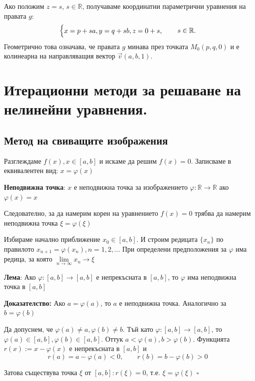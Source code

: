 \documentclass{article}
\renewcommand{\\}{\newline}
\newcommand{\doc}{\textbf{Доказателство: }}
\newcommand{\proven}{\hfill $\square$}
\begin{document}
Ако положим $z = s$, $s \in \mathbb{R}$, получаваме координатни параметрични уравнения на правата $g$:
\[
\begin{cases}
x = p + s a, \\
y = q + s b, \\
z = 0 + s,
\end{cases}
\quad s \in \mathbb{R}.
\]
Геометрично това означава, че правата $g$ минава през точката $M_0(p, q, 0)$ и е колинеарна на направляващия вектор $\vec{v}(a, b, 1)$.
\newpage


\section{Итерационни методи за решаване на нелинейни уравнения.}

\subsection{Метод на свиващите изображения}

Разглеждаме \(f(x), x \in [a, b]\) и искаме да решим \(f(x) = 0\). Записваме в еквивалентен вид: \(x = \varphi(x)\)

\textbf{Неподвижна точка}: \(x\) е неподвижна точка за изображението \(\varphi: \mathbb{R} \to \mathbb{R}\) ако \(\varphi(x) = x\)    

Следователно, за да намерим корен на уравнението \(f(x) = 0\) трябва да намерим неподвижна точка \(\xi = \varphi(\xi)\)      

Избираме начално приближение \(x_0 \in [a, b]\). И строим редицата \(\{x_n\}\) по правилото \(x_{n+1} = \varphi(x_n), n = 1, 2,...\) 
При определени предположения за \(\varphi\) има редица, за която \(\underset{n\to \infty}{\lim}x_n \to \xi\)   

\textbf{Лема}: Ако \(\varphi: [a, b] \to [a, b]\) е непрекъсната в \([a, b]\), то \(\varphi\) има неподвижна точка в \([a, b]\) 

\doc Ако \(a = \varphi(a)\), то \(a\) е неподвижна точка. Аналогично за \(b = \varphi(b)\) 

Да допуснем, че \(\varphi(a) \not= a, \varphi(b) \not= b\). Тъй като \(\varphi: [a,b] \to [a, b]\), то \(\varphi(a) \in [a, b], \varphi(b) \in [a, b]\). Оттук \(a < \varphi(a), b > \varphi(b)\). Функцията \(r(x) := x - \varphi(x)\) е непрекъсната в \([a, b]\) и \[
  r(a) = a - \varphi(a) < 0, \qquad r(b) = b - \varphi(b) > 0
\] 

Затова съществува точка \(\xi\) от \([a, b]: r(\xi) = 0\), т.е. \(\xi = \varphi(\xi)\) \proven   
\end{document}
